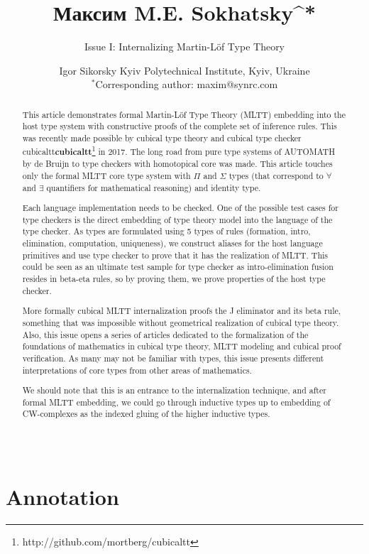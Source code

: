 \documentclass{article}
\theoremstyle{definition}
\begin{document}
\title{\small Максим M.E. Sokhatsky^{*}}
\author{Issue I: Internalizing Martin-Löf Type Theory}
\date{ \small Igor Sikorsky Kyiv Polytechnical Institute, Kyiv, Ukraine\\
       \small $^*$Corresponding author: maxim@synrc.com}

\maketitle

\section*{Annotation}

\begin{abstract}

\justifying

This article demonstrates formal Martin-Löf Type Theory (MLTT)
embedding into the host type system with constructive proofs
of the complete set of inference rules. This was recently made
possible by cubical type theory and cubical type
checker cubicaltt{\bf cubicaltt}\footnote{http://github.com/mortberg/cubicaltt} in 2017.
The long road from pure type systems of AUTOMATH by de Bruijn to type
checkers with homotopical core was made. This article touches only
the formal MLTT core type system with $\Pi$ and $\Sigma$ types (that correspond
to $\forall$ and $\exists$ quantifiers for mathematical reasoning) and identity type.

Each language implementation needs to be checked. One of the possible
test cases for type checkers is the direct embedding of type theory
model into the language of the type checker. As types are formulated
using 5 types of rules (formation, intro, elimination,
computation, uniqueness), we construct aliases for the host
language primitives and use type checker to prove that it has
the realization of MLTT. This could be seen as an ultimate test
sample for type checker as intro-elimination fusion resides in
beta-eta rules, so by proving them, we prove properties of the
host type checker.

More formally cubical MLTT internalization proofs the J eliminator
and its beta rule, something that was impossible without geometrical
realization of cubical type theory. Also, this issue opens a series
of articles dedicated to the formalization of the foundations
of mathematics in cubical type theory, MLTT modeling and cubical
proof verification. As many may not be familiar with  types,
this issue presents different interpretations of core types from
other areas of mathematics.

We should note that this is an entrance to the internalization
technique, and after formal MLTT embedding, we could go through
inductive types up to embedding of CW-complexes as the indexed
gluing of the higher inductive types.
\\
\\
\\
\end{abstract}
\end{document}
